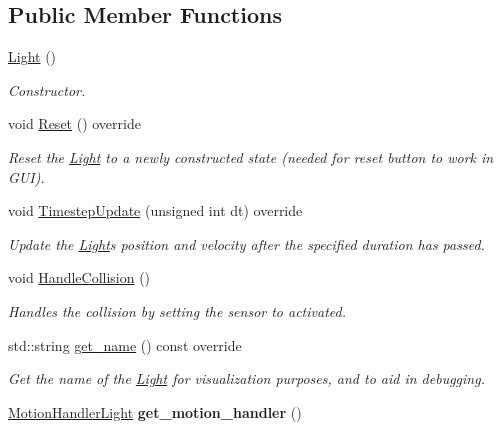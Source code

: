 \subsection*{Public Member Functions}
\begin{DoxyCompactItemize}
\item 
\hyperlink{classLight_aeb5df09a25a32f19fdffa761268ba24f}{Light} ()\hypertarget{classLight_aeb5df09a25a32f19fdffa761268ba24f}{}\label{classLight_aeb5df09a25a32f19fdffa761268ba24f}

\begin{DoxyCompactList}\small\item\em Constructor. \end{DoxyCompactList}\item 
void \hyperlink{classLight_a61485eb0684868b503e1b96e6a3206c3}{Reset} () override\hypertarget{classLight_a61485eb0684868b503e1b96e6a3206c3}{}\label{classLight_a61485eb0684868b503e1b96e6a3206c3}

\begin{DoxyCompactList}\small\item\em Reset the \hyperlink{classLight}{Light} to a newly constructed state (needed for reset button to work in G\+UI). \end{DoxyCompactList}\item 
void \hyperlink{classLight_a97934eec7489f9b072534f5e30a2d90d}{Timestep\+Update} (unsigned int dt) override
\begin{DoxyCompactList}\small\item\em Update the \hyperlink{classLight}{Light}\textquotesingle{}s position and velocity after the specified duration has passed. \end{DoxyCompactList}\item 
void \hyperlink{classLight_a3604f5290d7ac4e5d7e3fcefa2b4eed0}{Handle\+Collision} ()\hypertarget{classLight_a3604f5290d7ac4e5d7e3fcefa2b4eed0}{}\label{classLight_a3604f5290d7ac4e5d7e3fcefa2b4eed0}

\begin{DoxyCompactList}\small\item\em Handles the collision by setting the sensor to activated. \end{DoxyCompactList}\item 
std\+::string \hyperlink{classLight_a49b2e32cf8173353ac4689fdadbb95d5}{get\+\_\+name} () const override\hypertarget{classLight_a49b2e32cf8173353ac4689fdadbb95d5}{}\label{classLight_a49b2e32cf8173353ac4689fdadbb95d5}

\begin{DoxyCompactList}\small\item\em Get the name of the \hyperlink{classLight}{Light} for visualization purposes, and to aid in debugging. \end{DoxyCompactList}\item 
\hyperlink{classMotionHandlerLight}{Motion\+Handler\+Light} {\bfseries get\+\_\+motion\+\_\+handler} ()\hypertarget{classLight_a06cffcc49ecb10af298f2e45017f8871}{}\label{classLight_a06cffcc49ecb10af298f2e45017f8871}


\end{DoxyCompactItemize}
